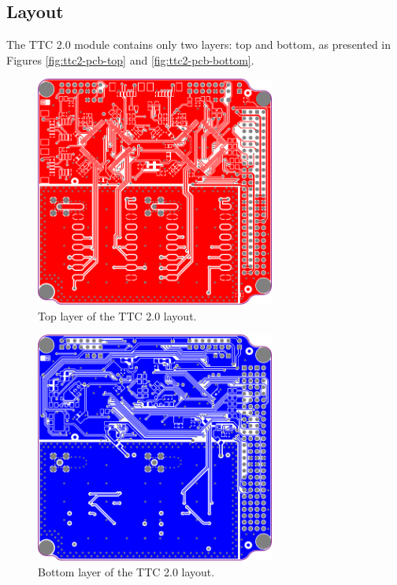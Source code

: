 \subsection{Layout}

The TTC 2.0 module contains only two layers: top and bottom, as presented in Figures \autoref{fig:ttc2-pcb-top} and \autoref{fig:ttc2-pcb-bottom}.

\begin{figure}[!ht]
    \begin{center}
        \includegraphics[width=0.7\textwidth]{figures/ttc2-layout-top.png}
        \caption{Top layer of the TTC 2.0 layout.}
        \label{fig:ttc2-layout-top}
    \end{center}
\end{figure}

\begin{figure}[!ht]
    \begin{center}
        \includegraphics[width=0.7\textwidth]{figures/ttc2-layout-bottom.png}
        \caption{Bottom layer of the TTC 2.0 layout.}
        \label{fig:ttc2-layout-bottom}
    \end{center}
\end{figure}

